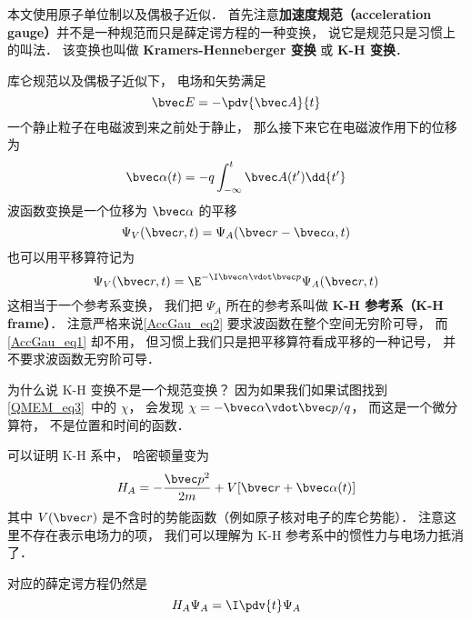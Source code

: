 

本文使用原子单位制以及偶极子近似． 首先注意\textbf{加速度规范（acceleration gauge）}并不是一种规范而只是薛定谔方程的一种变换， 说它是规范只是习惯上的叫法． 该变换也叫做 \textbf{Kramers-Henneberger 变换} 或 \textbf{K-H 变换}．

库仑规范以及偶极子近似下， 电场和矢势满足
\begin{equation}
\bvec E = -\pdv{\bvec A}{t}
\end{equation}
一个静止粒子在电磁波到来之前处于静止， 那么接下来它在电磁波作用下的位移为
\begin{equation}
\bvec \alpha(t) = -q\int_{-\infty}^t \bvec A(t') \dd{t'}
\end{equation}
波函数变换是一个位移为 $\bvec \alpha$ 的平移
\begin{equation}\label{AccGau_eq1}
\Psi_V(\bvec r, t) = \Psi_A(\bvec r - \bvec \alpha, t)
\end{equation}
也可以用平移算符记为
\begin{equation}\label{AccGau_eq2}
\Psi_V(\bvec r, t) = \E^{-\I \bvec \alpha \vdot \bvec p} \Psi_A(\bvec r, t)
\end{equation}
这相当于一个参考系变换， 我们把 $\Psi_A$ 所在的参考系叫做 \textbf{K-H 参考系（K-H frame）}． 注意严格来说\autoref{AccGau_eq2} 要求波函数在整个空间无穷阶可导， 而\autoref{AccGau_eq1} 却不用， 但习惯上我们只是把平移算符看成平移的一种记号， 并不要求波函数无穷阶可导．

为什么说 K-H 变换不是一个规范变换？ 因为如果我们如果试图找到\autoref{QMEM_eq3}~中的 $\chi$， 会发现 $\chi = -\bvec \alpha \vdot \bvec p/q$， 而这是一个微分算符， 不是位置和时间的函数．

可以证明 K-H 系中， 哈密顿量变为
\begin{equation}
H_A = -\frac{\bvec p^2}{2m} + V[\bvec r + \bvec \alpha(t)]
\end{equation}
其中 $V(\bvec r)$ 是不含时的势能函数（例如原子核对电子的库仑势能）． 注意这里不存在表示电场力的项， 我们可以理解为 K-H 参考系中的惯性力与电场力抵消了．

对应的薛定谔方程仍然是
\begin{equation}
H_A \Psi_A = \I \pdv{t} \Psi_A
\end{equation}
